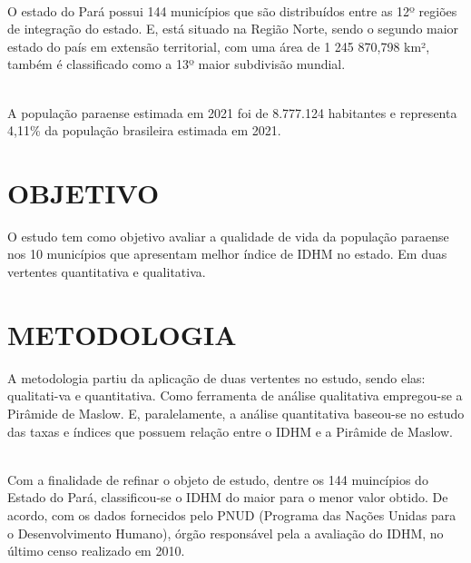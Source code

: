 \documentclass[a4paper, 10pt]{article}
\begin{document}
\\

O estado do Pará possui 144 municípios que são distribuídos entre as 12º regiões de integração do estado. E, está situado na Região Norte, sendo o segundo maior estado do país em extensão territorial, com uma área de 1 245 870,798 km², também é classificado como a 13º maior subdivisão mundial.

\\

A população paraense estimada em 2021 foi de 8.777.124 habitantes e representa 4,11\% da população brasileira estimada em 2021. 

    \newpage
     
       \large
       \section{OBJETIVO}
    O estudo tem como objetivo avaliar a qualidade de vida da população paraense nos 10 municípios  que apresentam melhor índice de IDHM no estado. Em duas vertentes quantitativa e qualitativa.
       \onehalfspacing 
       
        \section{METODOLOGIA}
    
    A metodologia partiu da aplicação de duas vertentes no estudo, sendo elas: qualitati-va e quantitativa. Como ferramenta de análise qualitativa empregou-se a Pirâmide de Maslow. E, paralelamente, a análise quantitativa baseou-se no estudo das taxas e índices que possuem relação entre o IDHM e a Pirâmide de Maslow.
         
    \\
    Com a finalidade de refinar o objeto de estudo, dentre os 144 muincípios do Estado do Pará, classificou-se o IDHM do maior para o menor valor obtido. De acordo, com os dados fornecidos pelo PNUD (Programa das Nações Unidas para o Desenvolvimento Humano), órgão responsável pela a avaliação do IDHM, no último censo realizado em 2010.
    
\end{document}
